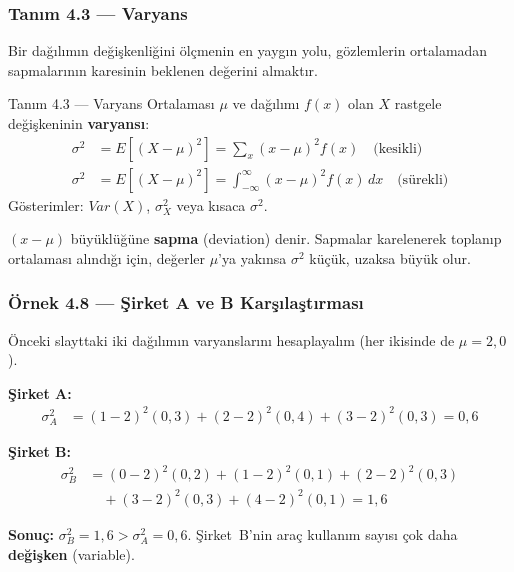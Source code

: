 \documentclass[light]{lutbeamer}
\begin{document}
\begin{frame}[fragile]
  \frametitle{Tanım 4.3 --- Varyans}
  Bir dağılımın değişkenliğini ölçmenin en yaygın yolu, gözlemlerin ortalamadan sapmalarının karesinin beklenen değerini almaktır.
  \begin{center}
    \begin{minipage}{0.95\textwidth}
      \begin{block}{Tanım 4.3 --- Varyans}
        Ortalaması $\mu$ ve dağılımı $f(x)$ olan $X$ rastgele değişkeninin \textbf{varyansı}:
        {\small
        \begin{align*}
          \sigma^2 &= E[(X-\mu)^2] = \sum_x (x-\mu)^2 f(x) \quad \text{(kesikli)} \\[4pt]
          \sigma^2 &= E[(X-\mu)^2] = \int_{-\infty}^{\infty} (x-\mu)^2 f(x)\,dx \quad \text{(sürekli)}
        \end{align*}
        }
        Gösterimler: $Var(X)$, $\sigma^2_X$ veya kısaca $\sigma^2$.
      \end{block}
    \end{minipage}
  \end{center}
  $(x - \mu)$ büyüklüğüne \textbf{sapma} (deviation) denir. Sapmalar karelenerek toplanıp ortalaması alındığı için, değerler $\mu$'ya yakınsa $\sigma^2$ küçük, uzaksa büyük olur.
\end{frame}

\begin{frame}[fragile]
  \frametitle{Örnek 4.8 --- Şirket A ve B Karşılaştırması}

  \smallskip
  Önceki slayttaki iki dağılımın varyanslarını hesaplayalım (her ikisinde de $\mu = 2{,}0$).

  \medskip
  \textbf{Şirket A:}
  {\small
  \begin{align*}
    \sigma^2_A &= (1-2)^2(0{,}3) + (2-2)^2(0{,}4) + (3-2)^2(0{,}3) = 0{,}6
  \end{align*}
  }

  \textbf{Şirket B:}
  {\small
  \begin{align*}
    \sigma^2_B &= (0-2)^2(0{,}2) + (1-2)^2(0{,}1) + (2-2)^2(0{,}3)\\
               &\quad + (3-2)^2(0{,}3) + (4-2)^2(0{,}1) = 1{,}6
  \end{align*}
  }

  \textbf{Sonuç:} $\sigma^2_B = 1{,}6 > \sigma^2_A = 0{,}6$. Şirket~B'nin araç kullanım sayısı çok daha \textbf{değişken} (variable).
\end{frame}
\end{document}
